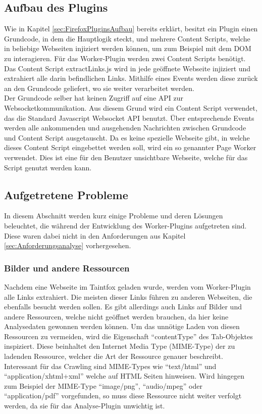 \subsection{Aufbau des Plugins}
Wie in Kapitel \ref{sec:FirefoxPluginsAufbau} bereits erklärt, besitzt ein Plugin einen Grundcode, in dem die Hauptlogik steckt, und mehrere Content Scripts, welche in beliebige Webseiten injiziert werden können, um zum Beispiel mit dem DOM zu interagieren. Für das Worker-Plugin werden zwei Content Scripts benötigt. \\
Das Content Script extractLinks.js wird in jede geöffnete Webseite injiziert und extrahiert alle darin befindlichen Links. Mithilfe eines Events werden diese zurück an den Grundcode geliefert, wo sie weiter verarbeitet werden. \\
Der Grundcode selber hat keinen Zugriff auf eine API zur Websocketkommunikation. Aus diesem Grund wird ein Content Script verwendet, das die Standard Javascript Websocket API benutzt. Über entsprechende Events werden alle ankommenden und ausgehenden Nachrichten zwischen Grundcode und Content Script ausgetauscht. Da es keine spezielle Webseite gibt, in welche dieses Content Script eingebettet werden soll, wird ein so genannter Page Worker verwendet. Dies ist eine für den Benutzer unsichtbare Webseite, welche für das Script genutzt werden kann.
\subsection{Aufgetretene Probleme}
In diesem Abschnitt werden kurz einige Probleme und deren Lösungen beleuchtet, die während der Entwicklung des Worker-Plugins aufgetreten sind. Diese waren dabei nicht in den Anforderungen aus Kapitel \ref{sec:Anforderungsanalyse} vorhergesehen.
\subsubsection{Bilder und andere Ressourcen}
Nachdem eine Webseite im Taintfox geladen wurde, werden vom Worker-Plugin alle Links extrahiert. Die meisten dieser Links führen zu anderen Webseiten, die ebenfalls besucht werden sollen. Es gibt allerdings auch Links auf Bilder und andere Ressourcen, welche nicht geöffnet werden brauchen, da hier keine Analysedaten gewonnen werden können. Um das unnötige Laden von diesen Ressourcen zu vermeiden, wird die Eigenschaft \mbox{\enquote{contentType}} des Tab-Objektes inspiziert. Diese beinhaltet den Internet Media Type (MIME-Type) der zu ladenden Ressource, welcher die Art der Ressource genauer beschreibt. Interessant für das Crawling sind MIME-Types wie \mbox{\enquote{text/html}} und \mbox{\enquote{application/xhtml+xml}} welche auf HTML Seiten hinweisen. Wird hingegen zum Beispiel der MIME-Type \enquote{image/png}, \enquote{audio/mpeg} oder \enquote{application/pdf} vorgefunden, so muss diese Ressource nicht weiter verfolgt werden, da sie für das Analyse-Plugin unwichtig ist. 
